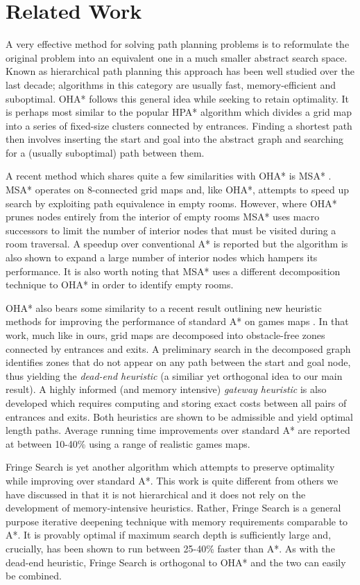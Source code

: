 \section{Related Work}
A very effective method for solving path planning problems is to reformulate the original problem
into an equivalent one in a much smaller abstract search space. 
Known as hierarchical path planning this approach has been well studied over the last decade;
algorithms in this category are usually fast, memory-efficient and suboptimal.
OHA* follows this general idea while seeking to retain optimality.
It is perhaps most similar to the popular HPA* algorithm \cite{botea04} 
which divides a grid map into a series of fixed-size clusters connected 
by entrances.
Finding a shortest path then involves inserting the start and goal into the 
abstract graph and searching for a (usually suboptimal) path between them.
\par
A recent method which shares quite a few similarities with OHA* is MSA* \cite{bolanca09}.
MSA* operates on 8-connected grid maps and, like OHA*, 
attempts to speed up search by exploiting path equivalence in empty rooms.
However, where OHA* prunes nodes entirely from the interior of empty rooms 
MSA* uses macro successors to limit the number of interior nodes that must 
be visited during a room traversal.
A speedup over conventional A* is reported but the algorithm is also
shown to expand a large number of interior nodes which hampers its performance.
It is also worth noting that MSA* uses a different decomposition 
technique to OHA* in order to identify empty rooms.
\par
OHA* also bears some similarity to a recent result outlining new heuristic methods for improving the 
performance of standard A* on games maps \cite{bjornsson06}.
In that work, much like in ours, grid maps are decomposed into obstacle-free zones connected by entrances 
and exits. 
A preliminary search in the decomposed graph identifies zones that do not appear 
on any path between the start and goal node, thus yielding the \emph{dead-end heuristic} 
(a similiar yet orthogonal idea to our main result).
A highly informed (and memory intensive) \emph{gateway heuristic} is also developed which 
requires computing and storing exact costs between all pairs of entrances and exits.
Both heuristics are shown to be admissible and yield optimal length paths. 
Average running time improvements over standard A* are reported at between 10-40\% using a range of
realistic games maps.
\par
Fringe Search is yet another algorithm which attempts to preserve optimality
while improving over standard A*.
This work is quite different from others we have discussed in that it is not 
hierarchical and it does not rely on the development of memory-intensive heuristics.
Rather, Fringe Search is a general purpose iterative deepening technique with memory requirements
comparable to A*. 
It is provably optimal if maximum search depth is sufficiently large and, crucially, has been shown to 
run between 25-40\% faster than A*.
As with the dead-end heuristic, Fringe Search is orthogonal to OHA* and the two
can easily be combined.
